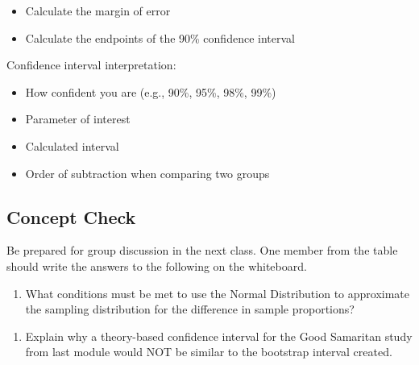 \documentclass[
]{report}
\providecommand{\tightlist}{%
  \setlength{\itemsep}{0pt}\setlength{\parskip}{0pt}}
\begin{document}
\begin{itemize}
\tightlist
\item
  Calculate the margin of error
\end{itemize}

\vspace{0.6in}

\begin{itemize}
\tightlist
\item
  Calculate the endpoints of the 90\% confidence interval
\end{itemize}

\vspace{0.6in}

Confidence interval interpretation:

\begin{itemize}
\item
  How confident you are (e.g., 90\%, 95\%, 98\%, 99\%)
\item
  Parameter of interest
\item
  Calculated interval
\item
  Order of subtraction when comparing two groups
\end{itemize}

\vspace{0.8in}

\subsection{Concept Check}\label{concept-check-8}

Be prepared for group discussion in the next class. One member from the table should write the answers to the following on the whiteboard.

\begin{enumerate}
\def\labelenumi{\arabic{enumi}.}
\tightlist
\item
  What conditions must be met to use the Normal Distribution to approximate the sampling distribution for the difference in sample proportions?
\end{enumerate}

\vspace{0.8in}

\begin{enumerate}
\def\labelenumi{\arabic{enumi}.}
\setcounter{enumi}{1}
\tightlist
\item
  Explain why a theory-based confidence interval for the Good Samaritan study from last module would NOT be similar to the bootstrap interval created.
\end{enumerate}
\end{document}
